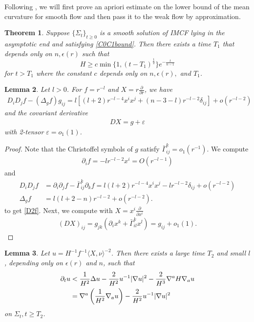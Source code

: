 \documentclass[12pt,twoside]{article}
\theoremstyle{plain}
\newtheorem{theorem}{Theorem}[section]
\newtheorem{lem}[theorem]{Lemma}
\theoremstyle{definition}
\theoremstyle{remark}
\newcommand{\pl}{\partial}
\newcommand{\na}{\nabla}
\newcommand{\lt}{\left}
\newcommand{\rt}{\right}
\numberwithin{equation}{section}
\begin{document}
Following \cite{HI2}, we will first prove an apriori estimate on the lower bound of the mean curvature for smooth flow and then pass it to the weak flow by approximation.

\begin{theorem}\label{main_imcf}
Suppose $\{ \Sigma_t\}_{t \ge 0}$ is a smooth solution of IMCF lying in the asymptotic end and satisfying \eqref{C0C1bound}. Then there exists a time $T_1$ that depends only on $n,\epsilon(r)$ such that 
\[ H \ge c \min \{ 1, (t - T_1)^{\frac{1}{2}} \} e^{-\frac{t}{n-1}} \] 
for $t > T_1$ where the constant $c$ depends only on $n,\epsilon(r),$ and $T_1$. 
\end{theorem}


\begin{lem}
Let $l > 0$. For $f = r^{-l}$ and $X = r \frac{\pl}{\pl r}$, we have \begin{align}\label{D2f}
D_iD_j f -(\Delta_g f) g_{ij}  = l \lt[ (l+2) r^{-l-4} x^ix^j + (n-3-l) r^{-l-2}\delta_{ij} \rt] + o(r^{-l-2})
\end{align}
and the covariant derivative
\begin{align}\label{DX}
D X = g + \varepsilon
\end{align}
with 2-tensor $\varepsilon = o_1(1)$. 
\end{lem}
\begin{proof} Note that the Christoffel symbols of $g$ satisfy $\bar\Gamma_{ij}^k = o_1(r^{-1})$. We compute
\begin{align*}
\pl_i f = -l r^{-l-2} x^i = O(r^{-l-1})
\end{align*}
and
\begin{align*}
D_iD_j f &= \pl_i\pl_j f - \bar\Gamma_{ij}^k \pl_k f = l(l+2) r^{-l-4} x^ix^j - l r^{-l-2}\delta_{ij} + o(r^{-l-2})\\
\Delta_g f &= l(l+2-n) r^{-l-2} +o(r^{-l-2}). 
\end{align*}
to get \eqref{D2f}. Next, we compute with $X = x^i \frac{\pl}{\pl x^i}$
\begin{align*}
(DX)_{ij} = g_{jk} \lt( \pl_i x^k + \bar\Gamma_{il}^k x^l \rt) = g_{ij} + o_1(1).
\end{align*}
 \end{proof}

\begin{lem}\label{differential inequality}
Let $u = H^{-1} f^{-1} \langle X,\nu \rangle^{-2}$. Then there exists a large time $T_2$ and small $l$, depending only on $\epsilon(r)$ and $n$, such that 
\begin{align}
\pl_t u &< \frac{1}{H^2}\Delta u - \frac{2}{H^2} u^{-1} |\na u|^2 - \frac{2}{H^3} \na^a H \na_a u \notag\\
&= \na^a \lt( \frac{1}{H^2} \na_a u \rt) - \frac{2}{H^2} u^{-1}|\na u|^2
\end{align}
on $\Sigma_t, t \ge T_2$. 
\end{lem}
 
\end{document}
